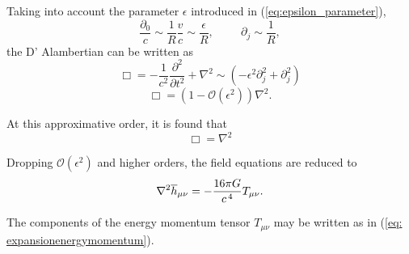 Taking into account the parameter $\epsilon$ introduced in (\ref{eq:epsilon_parameter}),
\begin{equation}
  \frac{\partial_0}{c} \sim \frac{1}{R}\frac{v}{c} \sim \frac{\epsilon}{R}, \hspace{1cm} \partial_{j} \sim \frac{1}{R},
  \label{eq:aproxderivatives}
\end{equation}
the D' Alambertian can be written as
\begin{equation}
  \Box = -\frac{1}{c^2}\frac{\partial^2}{\partial t^2} + \nabla^2 \sim (-\epsilon ^2 \partial_j^2 + \partial_j^2)
\end{equation}
\begin{equation}
  \Box = (1-\mathcal{O}(\epsilon ^2))\nabla^2.
\end{equation}

At this approximative order, it is found that
\begin{equation}
  \Box = \nabla^2 
\end{equation}


Dropping  $\mathcal{O}(\epsilon^2)$  and higher orders, the field equations are reduced to
\begin{equation}
   \nabla^2 \overline{h}_{\mu \nu} = - \frac{16\pi G}{c^{\hspace{0.05cm}4}} T_{\mu \nu}.
\end{equation}

The components of the energy momentum tensor $T_{\mu \nu}$ may be written as in (\ref{eq: expansionenergymomentum}).\\


